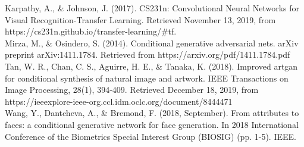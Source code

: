 \documentclass[11pt]{article}
\begin{document}
Karpathy, A., \& Johnson, J. (2017). CS231n: Convolutional Neural
Networks for Visual Recognition-Transfer Learning. Retrieved November
13, 2019, from https://cs231n.github.io/transfer-learning/\#tf.\\

Mirza, M., \& Osindero, S. (2014). Conditional generative adversarial
nets. arXiv preprint arXiv:1411.1784. Retrieved from
https://arxiv.org/pdf/1411.1784.pdf\\

Tan, W. R., Chan, C. S., Aguirre, H. E., \& Tanaka, K. (2018). Improved
artgan for conditional synthesis of natural image and artwork. IEEE
Transactions on Image Processing, 28(1), 394-409. Retrieved December 18,
2019, from https://ieeexplore-ieee-org.ccl.idm.oclc.org/document/8444471\\

Wang, Y., Dantcheva, A., \& Bremond, F. (2018, September). From
attributes to faces: a conditional generative network for face
generation. In 2018 International Conference of the Biometrics Special
Interest Group (BIOSIG) (pp. 1-5). IEEE.


    
    
    
    
\end{document}
